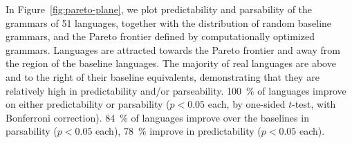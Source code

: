 \documentclass[9pt,twocolumn,twoside,lineno]{pnas-new}
\begin{document}
In Figure~\ref{fig:pareto-plane}, we plot predictability and parsability of the grammars of 51 languages, together with the distribution of random baseline grammars, and the Pareto frontier defined by computationally optimized grammars.
Languages are attracted towards the Pareto frontier and away from the region of the baseline languages.
The majority of real languages are above and to the right of their baseline equivalents, demonstrating that they are relatively high in predictability and/or parseability.
100~\% of languages improve on either predictability or parsability ($p<0.05$ each, by one-sided $t$-test, with Bonferroni correction).
84~\% of languages improve over the baselines in parsability ($p < 0.05$ each), 78~\% improve in predictability ($p < 0.05$ each).




\end{document}
